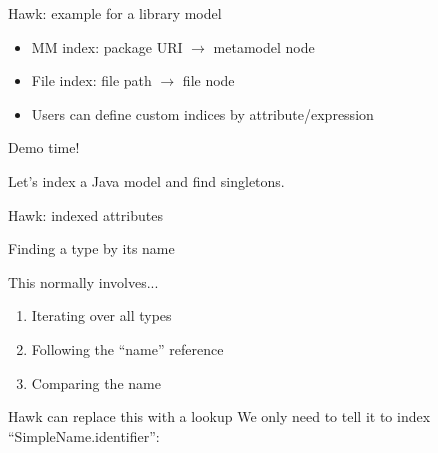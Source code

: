 \documentclass[10pt]{beamer}
\begin{document}
\begin{frame}{Hawk: example for a library model}
\begin{overprint}
    \begin{itemize}
    \item MM index: package URI $\rightarrow$ metamodel node
    \item File index: file path $\rightarrow$ file node
    \item Users can define custom indices by attribute/expression
    \end{itemize}
  \end{overprint}
\end{frame}

\begin{frame}[standout]
  Demo time!

  Let's index a Java model and find singletons.
\end{frame}

\begin{frame}[fragile]{Hawk: indexed attributes}
  \begin{block}{Finding a type by its name}
    
  \end{block}

  \begin{block}{This normally involves...}
    \begin{enumerate}
    \item Iterating over all types
    \item Following the ``name'' reference
    \item Comparing the name
    \end{enumerate}
  \end{block}

  \begin{alertblock}{Hawk can replace this with a lookup}
    We only need to tell it to index ``SimpleName.identifier'':
    
  \end{alertblock}
\end{frame}
\end{document}
